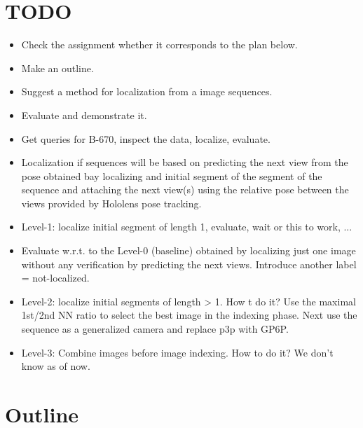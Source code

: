 \documentclass[twoside]{ctuthesis}
\theoremstyle{plain}
\theoremstyle{definition}
\theoremstyle{note}
\begin{document}
\maketitle

\chapter{TODO}

\begin{itemize}
    \item Check the assignment whether it corresponds to the plan below.
    \item Make an outline.
    \item Suggest a method for localization from a image sequences.
    \item Evaluate and demonstrate it.
    \item Get queries for B-670, inspect the data, localize, evaluate.
    \item Localization if sequences will be based on predicting the next view from the pose obtained bay localizing and initial segment of the segment of the sequence and attaching the next view(s) using the relative pose between the views provided by Hololens pose tracking. 
    \item Level-1: localize initial segment of length 1, evaluate, wait or this to work, ...
    \item Evaluate w.r.t. to the Level-0 (baseline) obtained by localizing just one image without any verification by predicting the next views. Introduce another label = not-localized.
    \item Level-2: localize initial segments of length > 1. How t do it? Use the maximal 1st/2nd NN ratio to select the best image in the indexing phase. Next use the sequence as a generalized camera and replace p3p with GP6P. 
    \item Level-3: Combine images before image indexing. How to do it? We don't know as of now.
\end{itemize}

\chapter{Outline}
\end{document}
